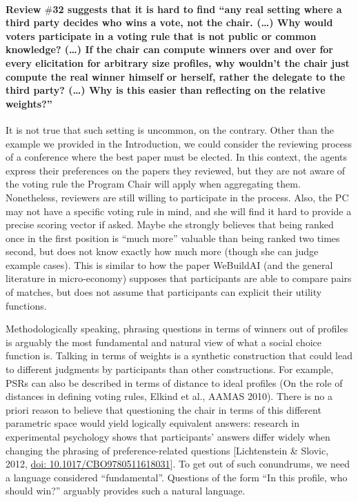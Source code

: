 \documentclass{article}
\begin{document}
\paragraph{Review $\#$32 suggests that it is hard to find “any real setting where a third party decides who wins a vote, not the chair. (…) Why would voters participate in a voting rule that is not public or common knowledge? (…) If the chair can compute winners over and over for every elicitation for arbitrary size profiles, why wouldn't the chair just compute the real winner himself or herself, rather the delegate to the third party? (…) Why is this easier than reflecting on the relative weights?”}
It is not true that such setting is uncommon, on the contrary. Other than the example we provided in the Introduction, we could consider the reviewing process of a conference where the best paper must be elected. In this context, the agents express their preferences on the papers they reviewed, but they are not aware of the voting rule the Program Chair will apply when aggregating them. Nonetheless, reviewers are still willing to participate in the process. 
Also, the PC may not have a specific voting rule in mind, and she will find it hard to provide a precise scoring vector if asked. Maybe she strongly believes that being ranked once in the first position is “much more” valuable than being ranked two times second, but does not know exactly how much more (though she can judge example cases). This is similar to how the paper WeBuildAI (and the general literature in micro-economy) supposes that participants are able to compare pairs of matches, but does not assume that participants can explicit their utility functions. 

Methodologically speaking, phrasing questions in terms of winners out of profiles is arguably the most fundamental and natural view of what a social choice function is. Talking in terms of weights is a synthetic construction that could lead to different judgments by participants than other constructions. 
For example, PSRs can also be described in terms of distance to ideal profiles (On the role of distances in defining voting rules, Elkind et al., AAMAS 2010). 
There is no a priori reason to believe that questioning the chair in terms of this different parametric space would yield logically equivalent answers: research in experimental psychology shows that participants’ answers differ widely when changing the phrasing of preference-related questions [Lichtenstein \& Slovic, 2012, \href{https://doi.org/10.1017/CBO9780511618031}{doi: 10.1017/CBO9780511618031}].
To get out of such conundrums, we need a language considered “fundamental”. Questions of the form “In this profile, who should win?” arguably provides such a natural language.
\end{document}
